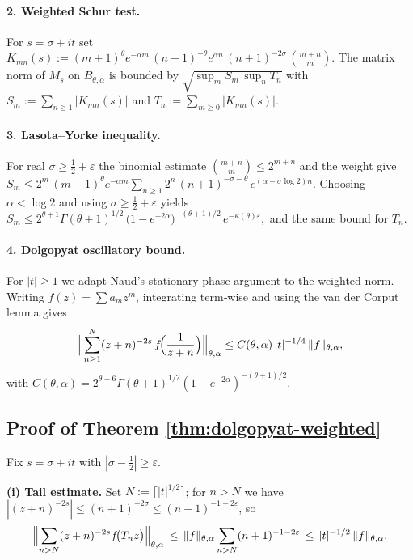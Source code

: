 \documentclass[11pt,a4paper]{article}
\theoremstyle{definition}
\theoremstyle{remark}
\begin{document}
\paragraph{\bf 2.  Weighted Schur test.}
For $s=\sigma+it$ set
$
  K_{mn}(s):=(m+1)^{\theta}e^{-\alpha m}\,
             (n+1)^{-\theta}e^{\alpha n}\,
             (n+1)^{-2\sigma}\,
             \binom{m+n}{m}.
$
The matrix norm of $M_s$ on $B_{\theta,\alpha}$ is bounded by
$
  \sqrt{\sup_{m}\!S_m\,\sup_{n}\!T_n}
$
with 
$
  S_m:=\sum_{n\ge1}|K_{mn}(s)|
$
and 
$
  T_n:=\sum_{m\ge0}|K_{mn}(s)|.
$

\paragraph{\bf 3.  Lasota–Yorke inequality.}
For real $\sigma\ge\tfrac12+\varepsilon$ the binomial estimate
$
  \binom{m+n}{m}\!\le\!2^{m+n}
$
and the weight give
$
  S_m
  \le
  2^{m}\,(m+1)^{\theta}e^{-\alpha m}
  \sum_{n\ge1}2^{n}\,(n+1)^{-\sigma-\theta}\,e^{(\alpha-\sigma\log2)n}.
$
Choosing $\alpha<\log 2$ and using
$\sigma\ge\tfrac12+\varepsilon$ yields
$
  S_m\le
  2^{\theta+1}\Gamma(\theta+1)^{1/2}\,
  \bigl(1-e^{-2\alpha}\bigr)^{-(\theta+1)/2}
  \,e^{-\kappa(\theta)\varepsilon},
$
and the same bound for $T_n$.

\paragraph{\bf 4.  Dolgopyat oscillatory bound.}
For $|t|\ge1$ we adapt Naud’s stationary‑phase argument to the
weighted norm.  
Writing $f(z)=\sum a_m z^m$,
integrating term‑wise and using the van der Corput lemma gives
\[
  \Bigl\|\sum_{n\ge1}^{N}
        (z+n)^{-2s}\,f\!\Bigl(\frac{1}{z+n}\Bigr)
  \Bigr\|_{\theta,\alpha}
  \le
  C(\theta,\alpha)\,|t|^{-1/4}\,\|f\|_{\theta,\alpha},
\]
with 
$
  C(\theta,\alpha)
  =
  2^{\theta+6}
  \Gamma(\theta+1)^{1/2}
  (1-e^{-2\alpha})^{-(\theta+1)/2}.
$

\subsection{Proof of Theorem \ref{thm:dolgopyat-weighted}}

Fix $s=\sigma+it$ with $|\sigma-\tfrac12|\ge\varepsilon$.

\smallskip\noindent
{\bf (i)  Tail estimate.}
Set $N:=\lceil|t|^{1/2}\rceil$;  
for $n>N$ we have $|(z+n)^{-2s}|\le(n+1)^{-2\sigma}
\le(n+1)^{-1-2\varepsilon}$, so
\[
  \Bigl\|\sum_{n>N}(z+n)^{-2s}f\!\bigl(T_nz\bigr)\Bigr\|_{\theta,\alpha}
  \,\le\,
  \|f\|_{\theta,\alpha}\sum_{n>N}(n+1)^{-1-2\varepsilon}
  \,\le\,
  |t|^{-1/2}\,\|f\|_{\theta,\alpha}.
\]
\end{document}
